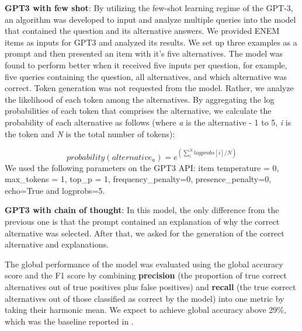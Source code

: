 \documentclass{article}
\begin{document}
\textbf{GPT3 with few shot}: By utilizing the few-shot learning regime of the GPT-3, an algorithm was developed to input and analyze multiple queries into the model that contained the question and its alternative answers.  We provided ENEM items as inputs for GPT3 and analyzed its results. We set up three examples as a prompt and then presented an item with it's five alternatives. The model was found to perform better when it received five inputs per question, for example, five queries containing the question, all alternatives, and which alternative was correct. Token generation was not requested from the model. Rather, we analyze the likelihood of each token among the alternatives. By aggregating the log probabilities of each token that comprises the alternative, we calculate the probability of each alternative as follows (where \textit{a} is the alternative - 1 to 5, \textit{i} is the token and \textit{N} is the total number of tokens): 

\begin{equation} \label{eq1}
probability(alternative_{a}) = e^{\left(\sum_{i}^{N} logprobs[i]/N\right)}
\end{equation}
We used the following parameters on the GPT3 API: item temperature = 0, max\_tokens = 1, top\_p = 1, frequency\_penalty=0, presence\_penalty=0, echo=True and logprobs=5.


\textbf{GPT3 with chain of thought}: In this model, the only difference from the previous one is that the prompt contained an explanation of why the correct alternative was selected. After that, we asked for the generation of the correct alternative and explanations. 

The global performance of the model was evaluated using the global accuracy score and the F1 score by combining \textbf{precision}  (the proportion of true correct alternatives out of true positives plus false positives) and  \textbf{recall}  (the true correct alternatives out of those classified as correct by the model) into one metric by taking their harmonic mean. We expect to achieve global accuracy above 29\%, which was the baseline reported in \cite{8575587}.

\end{document}
